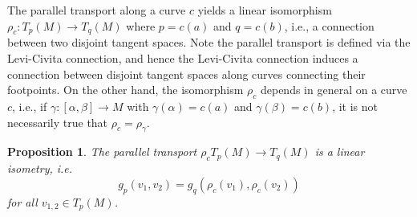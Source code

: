 \documentclass[letter-paper]{tufte-book}
\newtheorem{proposition}[theorem]{\color{pastel-blue}Proposition}
\begin{document}
The parallel transport along a curve $c$ yields a linear isomorphism $\rho_c :T_p(M) \to T_q(M)$ where $p=c(a)$ and $q=c(b)$, i.e., a connection between two disjoint tangent spaces. Note the parallel transport is defined via the Levi-Civita connection, and hence the Levi-Civita connection induces a connection between disjoint tangent spaces along curves connecting their footpoints. On the other hand, the isomorphism $\rho_c$ depends in general on a curve $c$, i.e., if $\gamma:[\alpha, \beta] \to M$ with $\gamma(\alpha) = c(a)$ and $\gamma(\beta) = c(b)$, it is not necessarily true that $\rho_c = \rho_\gamma$.

\begin{proposition}
  The parallel transport $\rho_c T_p(M) \to T_q(M)$ is a linear isometry, i.e.
  \begin{equation*}
    g_p(v_1, v_2) = g_q( \rho_c(v_1), \rho_c(v_2) )
  \end{equation*}
  for all $v_{1,2} \in T_p(M)$.
\end{proposition}
\end{document}
